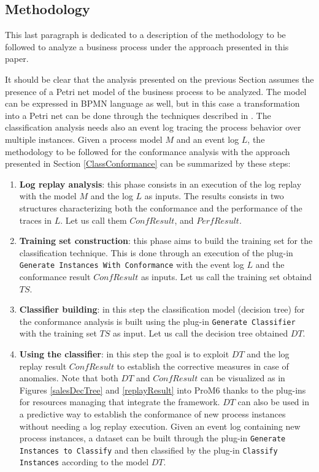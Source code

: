 \documentclass{llncs}
\begin{document}
\subsection{Methodology}
This last paragraph is dedicated to a description of the methodology to be followed to analyze a business process under the approach presented in this paper.

It should be clear that the analysis presented on the previous Section assumes the presence of a Petri net model of the business process to be analyzed. The model can be expressed in BPMN language as well, but in this case a transformation into a Petri net can be done through the techniques described in \cite{2}. The classification analysis  needs also an event log tracing the process behavior over multiple instances. Given a process model $M$ and an event log $L$, the methodology to be followed for the conformance analysis with the approach presented in Section \ref{ClassConformance} can be summarized by these steps:
\begin{enumerate}

\item \label{step1} \textbf{Log replay analysis}: this phase consists in an execution of the log replay with  the model $M$ and the log $L$ as inputs. The results consists in two structures characterizing both the conformance and the performance of the traces in $L$. Let us call them $ConfResult$, and $PerfResult$.

\item \label{step2} \textbf{Training set construction}: this phase aims to build the training set for the classification technique. This is done through an execution of the plug-in \texttt{Generate Instances With Conformance} with the event log $L$ and the conformance result $ConfResult$ as inputs. Let us call the training set obtaind $TS$.

\item \textbf{Classifier building}: in this step the classification model (decision tree) for the conformance analysis is built using the plug-in \texttt{Generate Classifier} with the training set $TS$ as input. Let us call the decision tree obtained $DT$.

\item \textbf{Using the classifier}: in this step the goal is to exploit $DT$ and the log replay result $ConfResult$ to establish the corrective measures in case of anomalies. Note that both $DT$ and $ConfResult$ can be visualized as in Figures \ref{salesDecTree} and \ref{replayResult} into ProM6 thanks to the plug-ins for resources managing that integrate the framework. $DT$ can also be used in a predictive way to establish the conformance of new process instances without needing a log replay execution. Given an event log containing new process instances, a dataset can be built through the plug-in \texttt{Generate Instances to Classify} and then classified by the plug-in \texttt{Classify Instances} according to the model $DT$.
\end{enumerate}
\end{document}
